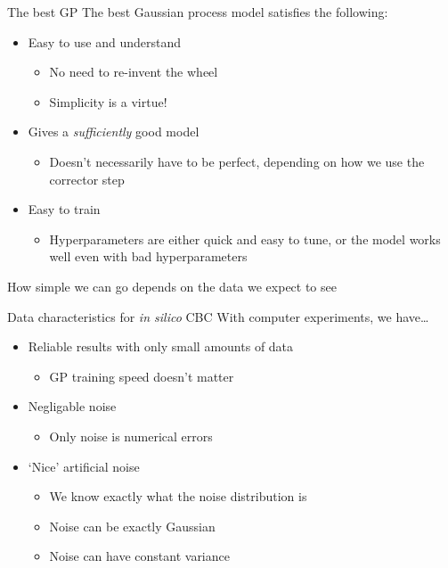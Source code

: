\documentclass[presentation]{beamer}
\begin{document}
\begin{frame}[label={sec:org1ad597d}]{The best GP}
The best Gaussian process model satisfies the following:

\vfill

\begin{itemize}
\item Easy to use and understand
\begin{itemize}
\item No need to re-invent the wheel
\item Simplicity is a virtue!
\end{itemize}
\item Gives a \emph{sufficiently} good model
\begin{itemize}
\item Doesn't necessarily have to be perfect, depending on how we use the corrector step
\end{itemize}
\item Easy to train
\begin{itemize}
\item Hyperparameters are either quick and easy to tune, or the model works well even with bad hyperparameters
\end{itemize}
\end{itemize}

\vfill

How simple we can go depends on the data we expect to see
\end{frame}

\begin{frame}[label={sec:orgb4efd0a}]{Data characteristics for \emph{in silico} CBC}
With computer experiments, we have\ldots{}

\vfill

\begin{itemize}
\item Reliable results with only small amounts of data
\begin{itemize}
\item GP training speed doesn't matter
\end{itemize}
\item Negligable noise
\begin{itemize}
\item Only noise is numerical errors
\end{itemize}
\item `Nice' artificial noise
\begin{itemize}
\item We know exactly what the noise distribution is
\item Noise can be exactly Gaussian
\item Noise can have constant variance
\end{itemize}
\end{itemize}
\end{frame}
\end{document}
